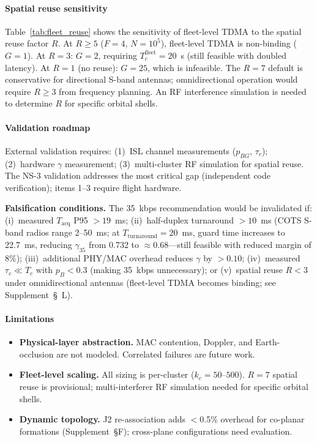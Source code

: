 \documentclass[journal]{IEEEtran}
\begin{document}
\paragraph{Spatial reuse sensitivity}
Table~\ref{tab:fleet_reuse} shows the sensitivity of fleet-level TDMA to the spatial reuse factor $R$. At $R \geq 5$ ($F{=}4$, $N{=}10^5$), fleet-level TDMA is non-binding ($G{=}1$). At $R{=}3$: $G{=}2$, requiring $T_c^{\text{fleet}}{=}20$~s (still feasible with doubled latency). At $R{=}1$ (no reuse): $G{=}25$, which is infeasible. The $R{=}7$ default is conservative for directional S-band antennas; omnidirectional operation would require $R \geq 3$ from frequency planning. An RF interference simulation is needed to determine $R$ for specific orbital shells.

\paragraph{Validation roadmap}
External validation requires: (1)~ISL channel measurements ($p_{BG}$, $\tau_c$); (2)~hardware $\gamma$ measurement; (3)~multi-cluster RF simulation for spatial reuse. The NS-3 validation addresses the most critical gap (independent code verification); items 1--3 require flight hardware.

\textbf{Falsification conditions.} The 35~kbps recommendation would be invalidated if: (i)~measured $T_{\text{acq}}$ P95 $> 19$~ms; (ii)~half-duplex turnaround $> 10$~ms (COTS S-band radios range 2--50~ms; at $T_{\text{turnaround}} = 20$~ms, guard time increases to 22.7~ms, reducing $\gamma_{35}$ from 0.732 to ${\approx}0.68$---still feasible with reduced margin of 8\%); (iii)~additional PHY/MAC overhead reduces $\gamma$ by $> 0.10$; (iv)~measured $\tau_c \ll T_c$ with $p_B < 0.3$ (making 35~kbps unnecessary); or (v)~spatial reuse $R < 3$ under omnidirectional antennas (fleet-level TDMA becomes binding; see Supplement~\S~L).

\paragraph{Limitations}
\begin{itemize}
    \item \textbf{Physical-layer abstraction.} MAC contention, Doppler, and Earth-occlusion are not modeled. Correlated failures are future work.
    \item \textbf{Fleet-level scaling.} All sizing is per-cluster ($k_c = 50$--$500$). $R = 7$ spatial reuse is provisional; multi-interferer RF simulation needed for specific orbital shells.
    \item \textbf{Dynamic topology.} J2 re-association adds $<$0.5\% overhead for co-planar formations (Supplement~\S F); cross-plane configurations need evaluation.
\end{itemize}
\end{document}
